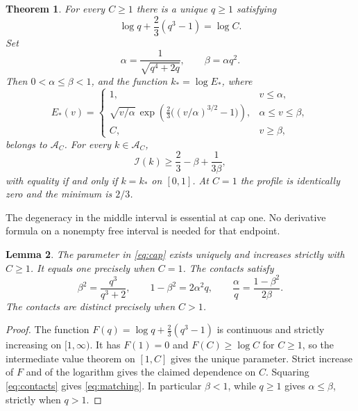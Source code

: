 \documentclass[11pt]{article}
\newtheorem{theorem}{Theorem}[section]
\newtheorem{lemma}[theorem]{Lemma}
\newcommand{\I}{\mathcal I}
\begin{document}
\begin{theorem}\label{thm:minimum}
For every $C\geq1$ there is a unique $q\geq1$ satisfying
\begin{equation}\label{eq:cap}
 \log q+\frac23(q^3-1)=\log C.
\end{equation}
Set
\begin{equation}\label{eq:contacts}
 \alpha=\frac1{\sqrt{q^4+2q}},\qquad \beta=\alpha q^2.
\end{equation}
Then $0<\alpha\leq\beta<1$, and the function $k_*=\log E_*$, where
\begin{equation}\label{eq:candidate}
 E_*(v)=
 \begin{cases}
 1,&v\leq\alpha,\\
 \displaystyle\sqrt{v/\alpha}\,
  \exp\!\left(\frac23\bigl((v/\alpha)^{3/2}-1\bigr)\right),
   &\alpha\leq v\leq\beta,\\
 C,&v\geq\beta,
 \end{cases}
\end{equation}
belongs to $\mathcal A_C$. For every $k\in\mathcal A_C$,
\begin{equation}\label{eq:minimum}
 \I(k)\geq\frac23-\beta+\frac1{3\beta},
\end{equation}
with equality if and only if $k=k_*$ on $[0,1]$.
At $C=1$ the profile is identically zero and the minimum is $2/3$.
\end{theorem}

The degeneracy in the middle interval is essential at cap one. No derivative
formula on a nonempty free interval is needed for that endpoint.

\begin{lemma}\label{lem:parameter}
The parameter in \eqref{eq:cap} exists uniquely and increases strictly with
$C\geq1$. It equals one precisely when $C=1$. The contacts satisfy
\begin{equation}\label{eq:matching}
 \beta^2=\frac{q^3}{q^3+2},\qquad
 1-\beta^2=2\alpha^2q,\qquad
 \frac\alpha q=\frac{1-\beta^2}{2\beta}.
\end{equation}
The contacts are distinct precisely when $C>1$.
\end{lemma}

\begin{proof}
The function $F(q)=\log q+\frac23(q^3-1)$ is continuous and strictly
increasing on $[1,\infty)$. It has $F(1)=0$ and $F(C)\geq\log C$
for $C\geq1$, so the intermediate value theorem on $[1,C]$ gives the
unique parameter. Strict increase of $F$ and of the logarithm gives the
claimed dependence on $C$. Squaring \eqref{eq:contacts} gives
\eqref{eq:matching}. In particular $\beta<1$, while $q\geq1$ gives
$\alpha\leq\beta$, strictly when $q>1$.
\end{proof}
\end{document}
